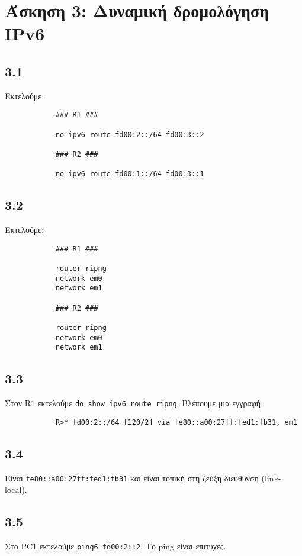 \documentclass[a4paper, 12pt]{article}
\begin{document}
\section*{Άσκηση 3: Δυναμική δρομολόγηση IPv6}

	\subsection*{3.1}
		Εκτελούμε:
		
		\begin{verbatim}
			### R1 ###
			
			no ipv6 route fd00:2::/64 fd00:3::2
			
			### R2 ###
			
			no ipv6 route fd00:1::/64 fd00:3::1
		\end{verbatim}

	\subsection*{3.2}
		Εκτελούμε:
		
		\begin{verbatim}
			### R1 ###
			
			router ripng
			network em0
			network em1
			
			### R2 ###
			
			router ripng
			network em0
			network em1
		\end{verbatim}

	\subsection*{3.3}
		Στον R1 εκτελούμε \verb|do show ipv6 route ripng|. Βλέπουμε μια εγγραφή:
		
		\begin{verbatim}
			R>* fd00:2::/64 [120/2] via fe80::a00:27ff:fed1:fb31, em1
		\end{verbatim}

	\subsection*{3.4}
		Είναι \verb|fe80::a00:27ff:fed1:fb31| και είναι τοπική στη ζεύξη διεύθυνση (link-local).

	\subsection*{3.5}
		Στο PC1 εκτελούμε \verb|ping6 fd00:2::2|. Το ping είναι επιτυχές.
\end{document}
